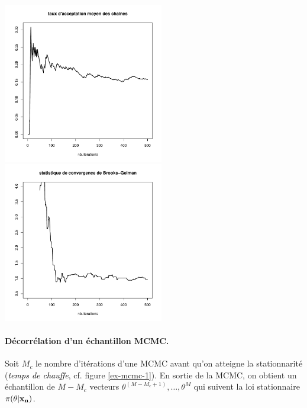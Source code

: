 \begin{center}
\includegraphics[width=7cm,height=7cm]{figures/calcul/alpha1.pdf}
\includegraphics[width=7cm,height=7cm]{figures/calcul/bg1.pdf}
\end{center}

\paragraph{Décorrélation d'un échantillon MCMC.}
Soit $M_c$ le nombre d'itérations d'une MCMC avant qu'on atteigne la stationnarité (\textcolor{black}{\it temps de chauffe}, cf. figure \ref{ex-mcmc-1}). En sortie de la MCMC, on obtient un échantillon de $M-M_c$ vecteurs $\theta^{(M-M_c+1)},\ldots,\theta^M$
qui suivent la loi stationnaire $\pi(\theta|{\bf x_n})$. \\

